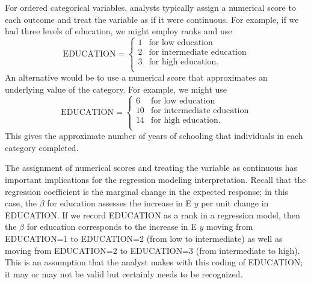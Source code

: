 For ordered categorical variables, analysts typically assign a
numerical score to each outcome and treat the variable as if it were
continuous. For example, if we had three levels of education, we
might employ ranks and use
\begin{equation*}
\textrm{EDUCATION} = \left\{ \begin{array}{cl}
        1           & \textrm{for low education} \\
        2           & \textrm{for intermediate education} \\
        3           & \textrm{for high education.} \\
\end{array} \right.
\end{equation*}
An alternative would be to use a numerical score that approximates
an underlying value of the category. For example, we might use
\begin{equation*}
\textrm{EDUCATION} = \left\{ \begin{array}{cl}
        6           & \textrm{for low education} \\
        10           & \textrm{for intermediate education} \\
        14           & \textrm{for high education.} \\
\end{array} \right.
\end{equation*}
This gives the approximate number of years of schooling that
individuals in each category completed.

The assignment of numerical scores and treating the variable as
continuous has important implications for the regression modeling
interpretation. Recall that the regression coefficient is the
marginal change in the expected response; in this case, the $\beta$
for education assesses the increase in E $y$ per unit change in
EDUCATION. If we record EDUCATION as a rank in a regression model,
then the $\beta$ for education corresponds to the increase in E $y$
moving from EDUCATION=1 to EDUCATION=2 (from low to intermediate) as
well as moving from EDUCATION=2 to EDUCATION=3 (from intermediate to
high). This is an assumption that the analyst makes with this coding
of EDUCATION; it may or may not be valid but certainly needs to be
recognized.

